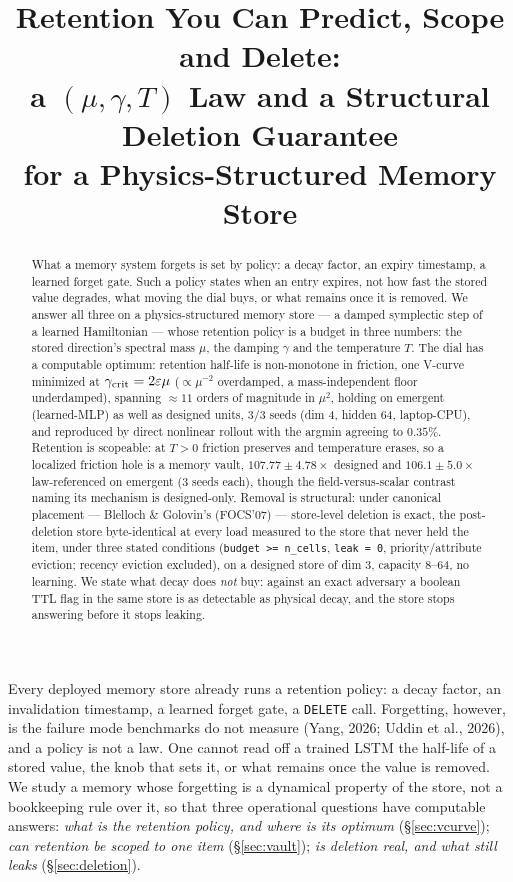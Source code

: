 \documentclass{article}
\title{Retention You Can Predict, Scope and Delete:\\ a $(\mu,\gamma,T)$ Law and a Structural Deletion Guarantee\\ for a Physics-Structured Memory Store}
\author{}
\makeatletter
\renewcommand\section{\@startsection{section}{1}{\z@}{-1.1ex plus -0.4ex minus -.2ex}{0.7ex plus .2ex}{\normalsize\bf\raggedright}}
\makeatother
\begin{document}
\maketitle
\begin{abstract}
What a memory system forgets is set by policy: a decay factor, an expiry timestamp, a learned forget gate. Such a policy states when an entry expires, not how fast the stored value degrades, what moving the dial buys, or what remains once it is removed. We answer all three on a physics-structured memory store --- a damped symplectic step of a learned Hamiltonian --- whose retention policy is a budget in three numbers: the stored direction's spectral mass $\mu$, the damping $\gamma$ and the temperature $T$. The dial has a computable optimum: retention half-life is non-monotone in friction, one V-curve minimized at $\gamma_{\rm crit}=2\varepsilon\mu$ ($\propto\mu^{-2}$ overdamped, a mass-independent floor underdamped), spanning $\approx11$ orders of magnitude in $\mu^2$, holding on emergent (learned-MLP) as well as designed units, 3/3 seeds (dim 4, hidden 64, laptop-CPU), and reproduced by direct nonlinear rollout with the argmin agreeing to $0.35\%$. Retention is scopeable: at $T>0$ friction preserves and temperature erases, so a localized friction hole is a memory vault, $107.77\pm4.78\times$ designed and $106.1\pm5.0\times$ law-referenced on emergent (3 seeds each), though the field-versus-scalar contrast naming its mechanism is designed-only. Removal is structural: under canonical placement --- Blelloch \& Golovin's (FOCS'07) --- store-level deletion is exact, the post-deletion store byte-identical at every load measured to the store that never held the item, under three stated conditions (\texttt{budget >= n\_cells}, \texttt{leak = 0}, priority/attribute eviction; recency eviction excluded), on a designed store of dim 3, capacity 8--64, no learning. We state what decay does \emph{not} buy: against an exact adversary a boolean TTL flag in the same store is as detectable as physical decay, and the store stops answering before it stops leaking.
\end{abstract}

\section{Introduction}\label{sec:intro}

Every deployed memory store already runs a retention policy: a decay factor, an invalidation timestamp, a learned forget gate, a \texttt{DELETE} call. Forgetting, however, is the failure mode benchmarks do not measure (Yang, 2026; Uddin et al., 2026), and a policy is not a law. One cannot read off a trained LSTM the half-life of a stored value, the knob that sets it, or what remains once the value is removed. We study a memory whose forgetting is a dynamical property of the store, not a bookkeeping rule over it, so that three operational questions have computable answers: \emph{what is the retention policy, and where is its optimum} (\S\ref{sec:vcurve}); \emph{can retention be scoped to one item} (\S\ref{sec:vault}); \emph{is deletion real, and what still leaks} (\S\ref{sec:deletion}).
\end{document}
